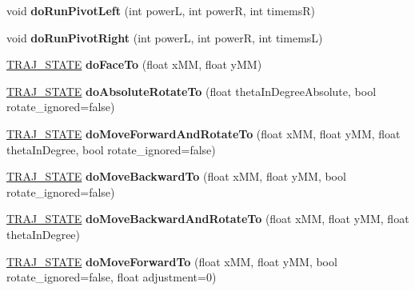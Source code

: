 \begin{DoxyCompactItemize}
void {\bfseries do\+Run\+Pivot\+Left} (int powerL, int powerR, int timemsR)
\item 
\mbox{\label{classAsserv_a79a9b2ee1d39046119673dc81733bdab}} 
void {\bfseries do\+Run\+Pivot\+Right} (int powerL, int powerR, int timemsL)
\item 
\mbox{\label{classAsserv_ae746b06ee24e29a511dc3c6f022ac35f}} 
\hyperlink{path__manager_8h_adb3360abeb29758da93865c8afcb80eb}{T\+R\+A\+J\+\_\+\+S\+T\+A\+TE} {\bfseries do\+Face\+To} (float x\+MM, float y\+MM)
\item 
\mbox{\label{classAsserv_ad41f75a5793e8990b2c70880b0011129}} 
\hyperlink{path__manager_8h_adb3360abeb29758da93865c8afcb80eb}{T\+R\+A\+J\+\_\+\+S\+T\+A\+TE} {\bfseries do\+Absolute\+Rotate\+To} (float theta\+In\+Degree\+Absolute, bool rotate\+\_\+ignored=false)
\item 
\mbox{\label{classAsserv_a15a5f1ec018cdc2624ea869a4e1dd6e7}} 
\hyperlink{path__manager_8h_adb3360abeb29758da93865c8afcb80eb}{T\+R\+A\+J\+\_\+\+S\+T\+A\+TE} {\bfseries do\+Move\+Forward\+And\+Rotate\+To} (float x\+MM, float y\+MM, float theta\+In\+Degree, bool rotate\+\_\+ignored=false)
\item 
\mbox{\label{classAsserv_aa2ec3b84e3cccf2145cc70e33f08dc58}} 
\hyperlink{path__manager_8h_adb3360abeb29758da93865c8afcb80eb}{T\+R\+A\+J\+\_\+\+S\+T\+A\+TE} {\bfseries do\+Move\+Backward\+To} (float x\+MM, float y\+MM, bool rotate\+\_\+ignored=false)
\item 
\mbox{\label{classAsserv_af438189501d475dcb6632ce63efe5e5f}} 
\hyperlink{path__manager_8h_adb3360abeb29758da93865c8afcb80eb}{T\+R\+A\+J\+\_\+\+S\+T\+A\+TE} {\bfseries do\+Move\+Backward\+And\+Rotate\+To} (float x\+MM, float y\+MM, float theta\+In\+Degree)
\item 
\mbox{\label{classAsserv_a960679fed5ab18f631d7847c95fc1f85}} 
\hyperlink{path__manager_8h_adb3360abeb29758da93865c8afcb80eb}{T\+R\+A\+J\+\_\+\+S\+T\+A\+TE} {\bfseries do\+Move\+Forward\+To} (float x\+MM, float y\+MM, bool rotate\+\_\+ignored=false, float adjustment=0)
\item 
\mbox{\label{classAsserv_a9ae528690268f84726565305c42718e5}} 

\end{DoxyCompactItemize}
